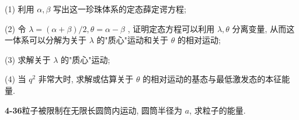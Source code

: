 (1) 利用 $\alpha, \beta$ 写出这一珍珠体系的定态薛定谔方程; 

(2) 令 $\lambda = (\alpha + \beta) / 2, \theta = \alpha - \beta$ , 证明定态方程可以利用 $\lambda, \theta$ 分离变量, 从而这一体系可以分解为关于 $\lambda$ 的"质心"运动和关于 $\theta$ 的相对运动; 

(3) 求解关于 $\lambda$ 的"质心"运动; 

(4) 当 $q^2$ 非常大时, 求解或估算关于 $\theta$ 的相对运动的基态与最低激发态的本征能量.

\vfill

\newpage
\vfill

\noindent
\textbf{4-36}\quad 粒子被限制在无限长圆筒内运动, 圆筒半径为 $a$, 求粒子的能量.

\vfill

\newpage